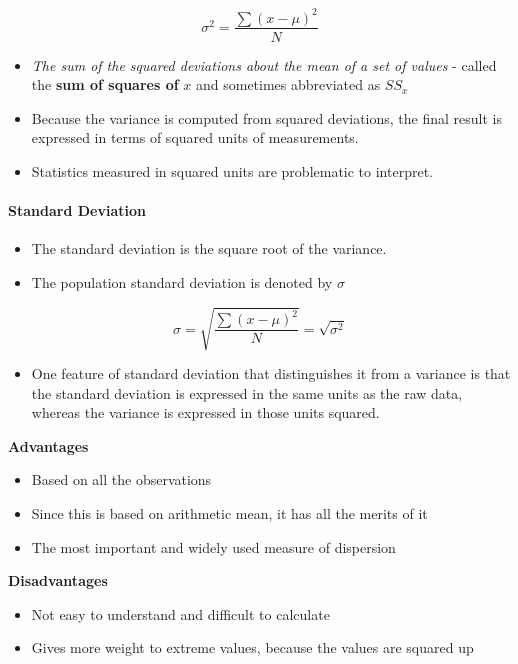 \documentclass[]{book}
\providecommand{\tightlist}{%
  \setlength{\itemsep}{0pt}\setlength{\parskip}{0pt}}
\let\oldparagraph\paragraph
\renewcommand{\paragraph}[1]{\oldparagraph{#1}\mbox{}}
\begin{document}
\[\sigma^2 = \frac{\sum(x-\mu)^2}{N}\]

\begin{itemize}
\item
  \emph{The sum of the squared deviations about the mean of a set of values} - called the \textbf{sum of squares of} \(x\) and sometimes abbreviated as \(SS_x\)
\item
  Because the variance is computed from squared deviations, the final result is expressed in terms of squared units of measurements.
\item
  Statistics measured in squared units are problematic to interpret.
\end{itemize}

\hypertarget{standard-deviation}{%
\paragraph{Standard Deviation}\label{standard-deviation}}

\begin{itemize}
\item
  The standard deviation is the square root of the variance.
\item
  The population standard deviation is denoted by \(\sigma\)
\end{itemize}

\[\sigma = \sqrt{\frac{\sum(x-\mu)^2}{N}}=\sqrt{\sigma^2}\]

\begin{itemize}
\tightlist
\item
  One feature of standard deviation that distinguishes it from a variance is that the standard deviation is expressed in the same units as the raw data, whereas the variance is expressed in those units squared.
\end{itemize}

\textbf{Advantages}

\begin{itemize}
\tightlist
\item
  Based on all the observations
\item
  Since this is based on arithmetic mean, it has all the merits of it
\item
  The most important and widely used measure of dispersion
\end{itemize}

\textbf{Disadvantages}

\begin{itemize}
\tightlist
\item
  Not easy to understand and difficult to calculate
\item
  Gives more weight to extreme values, because the values are squared up
\end{itemize}
\end{document}
